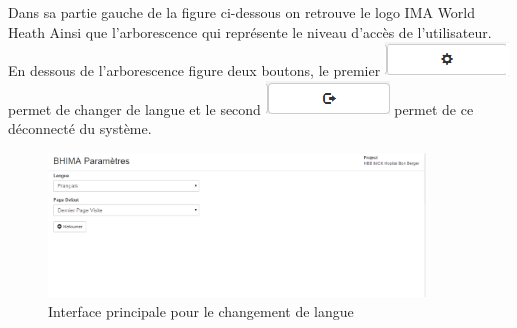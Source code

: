 \documentclass[12pt,a4paper]{report}
\begin{document}
Dans sa partie gauche de la figure ci-dessous on retrouve le logo IMA World Heath Ainsi que l'arborescence qui représente le niveau d'accès de l'utilisateur. En dessous de l'arborescence figure deux boutons, le premier \includegraphics[scale=0.5]{pic/lang.png} permet de changer de langue et le second \includegraphics[scale=0.5]{pic/logout.png} permet de ce déconnecté du système.

\begin{figure}[h]
\begin{center}
\includegraphics[width=10cm]{pic/changeLang.png}
\end{center}
\caption{Interface principale pour le changement de langue}
\label{Interface principale pour le changement de langue}
\end{figure} 
\newpage
\end{document}
